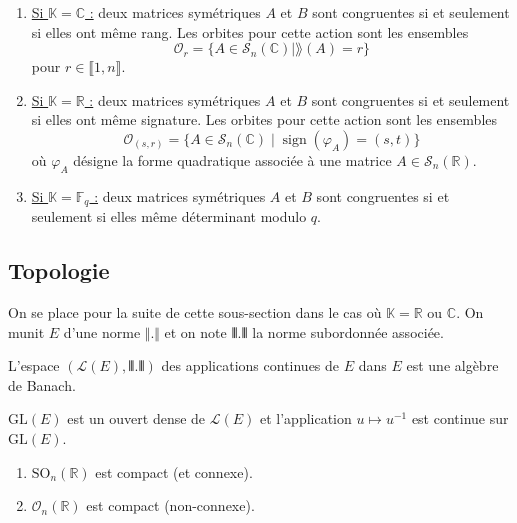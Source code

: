 	\begin{theorem}
		\begin{enumerate}[label=(\roman*)]
			\item \underline{Si $\mathbb{K} = \mathbb{C}$ :} deux matrices symétriques $A$ et $B$ sont congruentes si et seulement si elles ont même rang. Les orbites pour cette action sont les ensembles
			\[ \mathcal{O}_r = \{ A \in \mathcal{S}_n(\mathbb{C}) \mid \rang(A) = r \} \]
			pour $r \in \llbracket 1, n \rrbracket$.
			\item \underline{Si $\mathbb{K} = \mathbb{R}$ :} deux matrices symétriques $A$ et $B$ sont congruentes si et seulement si elles ont même signature. Les orbites pour cette action sont les ensembles
			\[ \mathcal{O}_(s,r) = \{ A \in \mathcal{S}_n(\mathbb{C}) \mid \operatorname{sign}(\varphi_A) = (s,t) \} \]
			où $\varphi_A$ désigne la forme quadratique associée à une matrice $A \in \mathcal{S}_n(\mathbb{R})$.
			\item \underline{Si $\mathbb{K} = \mathbb{F}_q$ :} deux matrices symétriques $A$ et $B$ sont congruentes si et seulement si elles même déterminant modulo $q$.
		\end{enumerate}
	\end{theorem}

	\subsection{Topologie}

	\reference{159}

	On se place pour la suite de cette sous-section dans le cas où $\mathbb{K} = \mathbb{R}$ ou $\mathbb{C}$. On munit $E$ d'une norme $\Vert . \Vert$ et on note $\VERT . \VERT$ la norme subordonnée associée.

	\begin{proposition}
		L'espace $(\mathcal{L}(E), \VERT . \VERT)$ des applications continues de $E$ dans $E$ est une algèbre de Banach.
	\end{proposition}

	\begin{theorem}
		$\mathrm{GL}(E)$ est un ouvert dense de $\mathcal{L}(E)$ et l'application $u \mapsto u^{-1}$ est continue sur $\mathrm{GL}(E)$.
	\end{theorem}

	\reference[C-G]{62}

	\begin{proposition}
		\begin{enumerate}[label=(\roman*)]
			\item $\mathrm{SO}_n(\mathbb{R})$ est compact (et connexe).
			\item $\mathcal{O}_n(\mathbb{R})$ est compact (non-connexe).
		\end{enumerate}
	\end{proposition}

